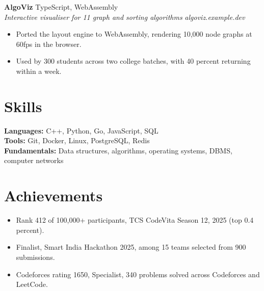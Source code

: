 \documentclass[10pt,a4paper]{article}
\newcommand{\role}[4]{%
  \textbf{#1} \hfill #2\\%
  \textit{#3} \hfill \textit{#4}\par\vspace{0.1em}%
}
\newenvironment{bullets}{%
  \begin{itemize}[leftmargin=1.05em,itemsep=0.12em,topsep=0.12em,parsep=0pt,label=\textbullet]%
}{\end{itemize}}
\begin{document}
\role{AlgoViz}{TypeScript, WebAssembly}{Interactive visualiser for 11 graph and sorting algorithms}{algoviz.example.dev}
\begin{bullets}
  \item Ported the layout engine to WebAssembly, rendering 10,000 node graphs at 60fps in the browser.
  \item Used by 300 students across two college batches, with 40 percent returning within a week.
\end{bullets}

\section{Skills}
\textbf{Languages:} C++, Python, Go, JavaScript, SQL\\
\textbf{Tools:} Git, Docker, Linux, PostgreSQL, Redis\\
\textbf{Fundamentals:} Data structures, algorithms, operating systems, DBMS, computer networks

\section{Achievements}
\begin{bullets}
  \item Rank 412 of 100,000+ participants, TCS CodeVita Season 12, 2025 (top 0.4 percent).
  \item Finalist, Smart India Hackathon 2025, among 15 teams selected from 900 submissions.
  \item Codeforces rating 1650, Specialist, 340 problems solved across Codeforces and LeetCode.
\end{bullets}
\end{document}
